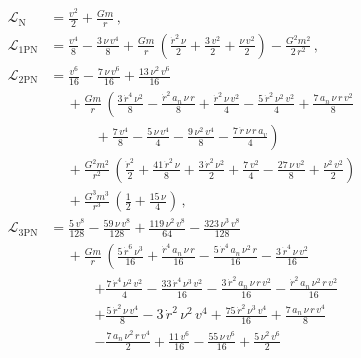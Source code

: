 \documentclass[prd,preprint,superscriptaddress,tightenlines,nofootinbib,
  eqsecnum,showpacs]{revtex4}
\begin{document}
\begin{subequations}\label{L}\begin{align}
\mathcal{L}_\text{N} &= \frac{v^2}{2} + \frac{G m}{r}\,,\\
\mathcal{L}_\text{1PN} &= \frac{v^4}{8} - \frac{3\,\nu\,v^4}{8} +
\frac{G m}{r}\,\left( \frac{\dot{r}^2\,\nu}{2} + \frac{3\,v^2}{2} +
\frac{\nu\,v^2}{2} \right)-\frac{G^2m^2}{2\,r^2}\,,\\ 
\mathcal{L}_\text{2PN} &= \frac{v^6}{16} - \frac{7\,\nu\,v^6}{16} +
\frac{13\,\nu^2\,v^6}{16} \nonumber\\ &\quad~ + \frac{G m}{r}\,\left(
\frac{3\,\dot{r}^4\,\nu^2}{8} - \frac{\dot{r}^2\,a_n\,\nu\,r}{8} +
\frac{\dot{r}^2\,\nu\,v^2}{4} - \frac{5\,\dot{r}^2\,\nu^2\,v^2}{4} +
\frac{7\,a_n\,\nu\,r\,v^2}{8} \right.\nonumber\\ &\quad\quad\quad~
+ \left.\frac{7\,v^4}{8} - \frac{5\,\nu\,v^4}{4} -
\frac{9\,\nu^2\,v^4}{8} - \frac{7\,\dot{r}\,\nu\,r\,a_v}{4} \right)
\nonumber\\ &\quad~ +\frac{G^2m^2}{r^2}\,\left( \frac{\dot{r}^2}{2} +
\frac{41\,\dot{r}^2\,\nu}{8} + \frac{3\,\dot{r}^2\,\nu^2}{2} +
\frac{7\,v^2}{4} - \frac{27\,\nu\,v^2}{8} + \frac{\nu^2\,v^2}{2}
\right) \nonumber\\ &\quad~ +\frac{G^3m^3}{r^3}\,\left( \frac{1}{2} +
\frac{15\,\nu}{4} \right)\,,\\ 
\mathcal{L}_\text{3PN} &= \frac{5\,v^8}{128} -
\frac{59\,\nu\,v^8}{128} + \frac{119\,\nu^2\,v^8}{64} -
\frac{323\,\nu^3\,v^8}{128} \nonumber\\ &\quad~ + \frac{G
  m}{r}\,\left( \frac{5\,\dot{r}^6\,\nu^3}{16} +
\frac{\dot{r}^4\,a_n\,\nu\,r}{16} -
\frac{5\,\dot{r}^4\,a_n\,\nu^2\,r}{16} -
\frac{3\,\dot{r}^4\,\nu\,v^2}{16}
\right.\nonumber\\ &\quad\quad\quad~\left.+
\frac{7\,\dot{r}^4\,\nu^2\,v^2}{4} -
\frac{33\,\dot{r}^4\,\nu^3\,v^2}{16} -
\frac{3\,\dot{r}^2\,a_n\,\nu\,r\,v^2}{16} -
\frac{\dot{r}^2\,a_n\,\nu^2\,r\,v^2}{16}
\right.\nonumber\\ &\quad\quad\quad~\left.+
\frac{5\,\dot{r}^2\,\nu\,v^4}{8} - 3\,\dot{r}^2\,\nu^2\,v^4
+\frac{75\,\dot{r}^2\,\nu^3\,v^4}{16} + \frac{7\,a_n\,\nu\,r\,v^4}{8}
\right.\nonumber\\ &\quad\quad\quad~\left.-
\frac{7\,a_n\,\nu^2\,r\,v^4}{2} + \frac{11\,v^6}{16} -
\frac{55\,\nu\,v^6}{16} + \frac{5\,\nu^2\,v^6}{2}

\end{align}
\end{subequations}
\end{document}
